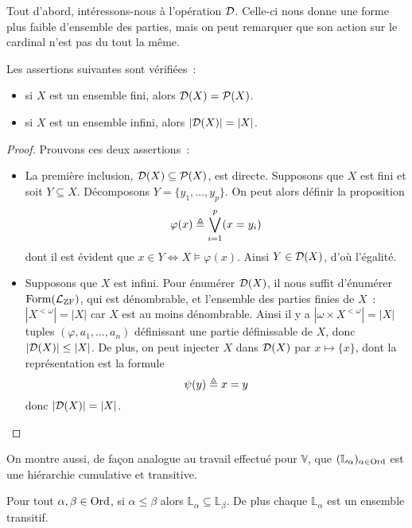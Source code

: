 Tout d'abord, intéressons-nous à l'opération $\mathcal{D}$. Celle-ci nous donne
une forme plus faible d'ensemble des parties, mais on peut remarquer que son
action sur le cardinal n'est pas du tout la même.

\begin{proposition}
  Les assertions suivantes sont vérifiées~:
  \begin{itemize}
  \item si $X$ est un ensemble fini, alors $\mathcal{D}(X) = \mathcal{P}(X)$.
  \item si $X$ est un ensemble infini, alors $|\mathcal{D}(X)| = |X|$.
  \end{itemize}
\end{proposition}

\begin{proof}
  Prouvons ces deux assertions~:
  \begin{itemize}
  \item La première inclusion, $\mathcal{D}(X)\subseteq\mathcal{P}(X)$, est directe.
    Supposons que $X$ est fini et soit $Y\subseteq X$. Décomposons
    $Y = \{y_1,\ldots,y_p\}$. On peut alors définir la proposition
    \[\varphi(x) \triangleq \bigvee_{i = 1}^p (x = y_i)\]
    dont il est évident que $x \in Y \iff X \models \varphi(x)$. Ainsi
    $Y\in \mathcal{D}(X)$, d'où l'égalité.
  \item Supposons que $X$ est infini. Pour énumérer $\mathcal{D}(X)$, il nous
    suffit d'énumérer $\operatorname{Form}(\mathcal L_{\operatorname{ZF}})$, qui est dénombrable, et
    l'ensemble des parties finies de $X$~: $|X^{<\omega}| = |X|$ car $X$ est
    au moins dénombrable. Ainsi il y a $|\omega \times X^{<\omega}| = |X|$
    tuples $(\varphi,a_1,\ldots,a_n)$ définissant une partie définissable de
    $X$, donc $|\mathcal{D}(X)|\leq |X|$. De plus, on peut injecter $X$ dans
    $\mathcal{D}(X)$ par $x\mapsto \{x\}$, dont la représentation est la
    formule
    \[\psi(y) \triangleq x = y \]
    donc $|\mathcal{D}(X)| = |X|$.
  \end{itemize}
\end{proof}

On montre aussi, de façon analogue au travail effectué pour $\mathbb V$, que
$(\mathbb L_\alpha)_{\alpha \in \operatorname{Ord}}$ est une hiérarchie cumulative et transitive.

\begin{proposition}
  Pour tout $\alpha,\beta \in \operatorname{Ord}$, si $\alpha \leq \beta$ alors
  $\mathbb L_{\alpha} \subseteq \mathbb L_\beta$. De plus chaque
  $\mathbb L_\alpha$ est un ensemble transitif.
\end{proposition}

